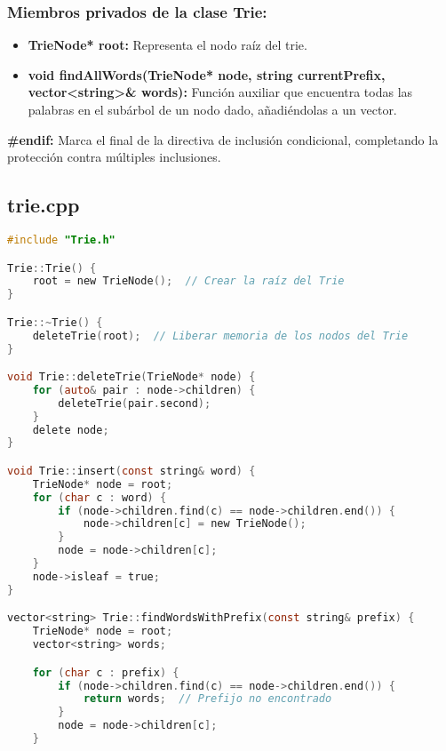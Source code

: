 \documentclass[corference]{IEEEtran}
\begin{document}
\begin{flushleft}
                \subsubsection{Miembros privados de la clase Trie:}
                \begin{itemize}
                    \item \textbf{TrieNode* root:} Representa el nodo raíz del trie.
                    \item \textbf{void findAllWords(TrieNode* node, string currentPrefix, vector\textless string\textgreater\& words):} Función auxiliar que encuentra todas las palabras en el subárbol de un nodo dado, añadiéndolas a un vector.
                \end{itemize}
                
                \item \textbf{\#endif:} Marca el final de la directiva de inclusión condicional, completando la protección contra múltiples inclusiones.

            \subsection{trie.cpp}
            
            \begin{lstlisting}[language=C, style=mystyle, caption={Código de la Clase trie}]
#include "Trie.h"

Trie::Trie() {
    root = new TrieNode();  // Crear la raíz del Trie
}

Trie::~Trie() {
    deleteTrie(root);  // Liberar memoria de los nodos del Trie
}

void Trie::deleteTrie(TrieNode* node) {
    for (auto& pair : node->children) {
        deleteTrie(pair.second); 
    }
    delete node;  
}

void Trie::insert(const string& word) {
    TrieNode* node = root;
    for (char c : word) {
        if (node->children.find(c) == node->children.end()) {
            node->children[c] = new TrieNode();
        }
        node = node->children[c];
    }
    node->isleaf = true;
}

vector<string> Trie::findWordsWithPrefix(const string& prefix) {
    TrieNode* node = root;
    vector<string> words;

    for (char c : prefix) {
        if (node->children.find(c) == node->children.end()) {
            return words;  // Prefijo no encontrado
        }
        node = node->children[c];
    }


\end{lstlisting}
\end{flushleft}
\end{document}
